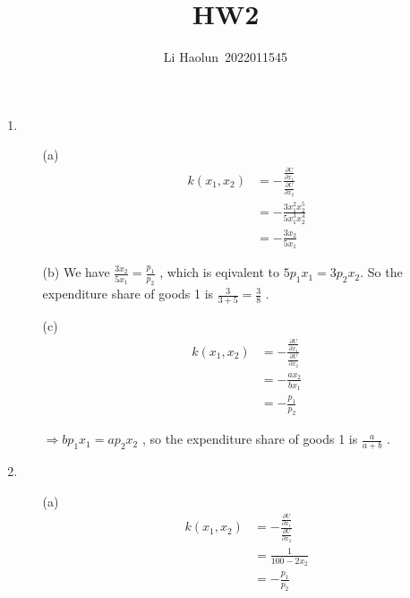 \documentclass{article}
\title{HW2}
\author{Li Haolun\ 2022011545}
\begin{document}
\maketitle
\begin{enumerate}
    \item \begin{enumerate}
        \item[(a)] 
        \begin{equation}
            \begin{aligned}
                k(x_1,x_2)
                &=-\frac{\frac{\partial U}{\partial x_1}}{\frac{\partial U}{\partial x_2}} \\
                &=-\frac{3x_1^2x_2^5}{5x_1^3x_2^4} \\
                &=-\frac{3x_2}{5x_1}
            \end{aligned}
            \nonumber
        \end{equation}
        \item[(b)] We have $\frac{3x_2}{5x_1}=\frac{p_1}{p_2}$ , which is eqivalent to $5p_1x_1=3p_2x_2$. 
        So the expenditure share of goods 1 is $\frac{3}{3+5}=\frac{3}{8}$ .
        \item[(c)] 
        \begin{equation}
            \begin{aligned}
                k(x_1,x_2)
                &=-\frac{\frac{\partial U}{\partial x_1}}{\frac{\partial U}{\partial x_2}} \\
                &=-\frac{ax_2}{bx_1} \\
                &=-\frac{p_1}{p_2}
            \end{aligned}
            \nonumber
        \end{equation} \par
        $\Rightarrow bp_1x_1=ap_2x_2$ , so the expenditure share of goods 1 is $\frac{a}{a+b}$ .
    \end{enumerate}
    \item \begin{enumerate}
        \item[(a)] 
        \begin{equation}
            \begin{aligned}
                k(x_1,x_2)
                &=-\frac{\frac{\partial U}{\partial x_1}}{\frac{\partial U}{\partial x_2}} \\
                &=\frac{1}{100-2x_2} \\
                &=-\frac{p_1}{p_2} \\

\end{aligned}
\end{equation}
\end{enumerate}
\end{enumerate}
\end{document}
